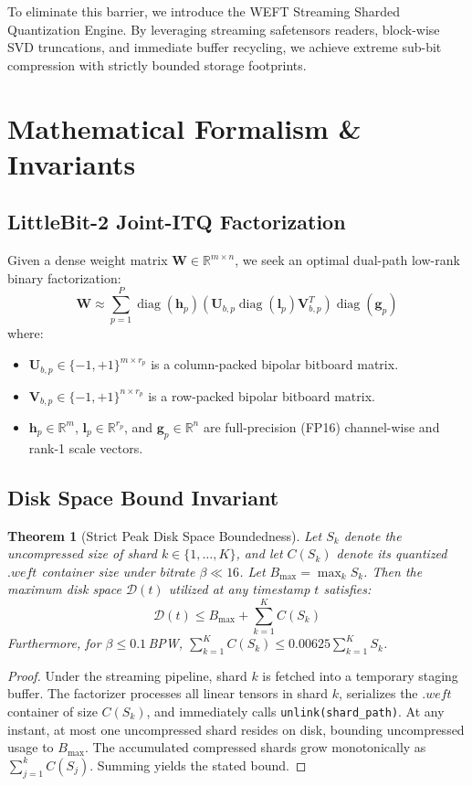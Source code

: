 \documentclass[11pt,a4paper]{article}
\newtheorem{theorem}{Theorem}
\begin{document}
To eliminate this barrier, we introduce the WEFT Streaming Sharded Quantization Engine. By leveraging streaming safetensors readers, block-wise SVD truncations, and immediate buffer recycling, we achieve extreme sub-bit compression with strictly bounded storage footprints.

\section{Mathematical Formalism \& Invariants}

\subsection{LittleBit-2 Joint-ITQ Factorization}
Given a dense weight matrix $\mathbf{W} \in \mathbb{R}^{m \times n}$, we seek an optimal dual-path low-rank binary factorization:
\begin{equation}
\mathbf{W} \approx \sum_{p=1}^P \operatorname{diag}(\mathbf{h}_p) \left( \mathbf{U}_{b,p} \operatorname{diag}(\mathbf{l}_p) \mathbf{V}_{b,p}^T \right) \operatorname{diag}(\mathbf{g}_p)
\end{equation}
where:
\begin{itemize}
    \item $\mathbf{U}_{b,p} \in \{-1, +1\}^{m \times r_p}$ is a column-packed bipolar bitboard matrix.
    \item $\mathbf{V}_{b,p} \in \{-1, +1\}^{n \times r_p}$ is a row-packed bipolar bitboard matrix.
    \item $\mathbf{h}_p \in \mathbb{R}^m$, $\mathbf{l}_p \in \mathbb{R}^{r_p}$, and $\mathbf{g}_p \in \mathbb{R}^n$ are full-precision (FP16) channel-wise and rank-1 scale vectors.
\end{itemize}

\subsection{Disk Space Bound Invariant}
\begin{theorem}[Strict Peak Disk Space Boundedness]
Let $S_k$ denote the uncompressed size of shard $k \in \{1, \dots, K\}$, and let $C(S_k)$ denote its quantized $.weft$ container size under bitrate $\beta \ll 16$. Let $B_{\max} = \max_k S_k$. Then the maximum disk space $\mathcal{D}(t)$ utilized at any timestamp $t$ satisfies:
\begin{equation}
\mathcal{D}(t) \le B_{\max} + \sum_{k=1}^K C(S_k)
\end{equation}
Furthermore, for $\beta \le 0.1$\,BPW, $\sum_{k=1}^K C(S_k) \le 0.00625 \sum_{k=1}^K S_k$.
\end{theorem}
\begin{proof}
Under the streaming pipeline, shard $k$ is fetched into a temporary staging buffer. The factorizer processes all linear tensors in shard $k$, serializes the $.weft$ container of size $C(S_k)$, and immediately calls \texttt{unlink(shard\_path)}. At any instant, at most one uncompressed shard resides on disk, bounding uncompressed usage to $B_{\max}$. The accumulated compressed shards grow monotonically as $\sum_{j=1}^k C(S_j)$. Summing yields the stated bound.
\end{proof}
\end{document}
